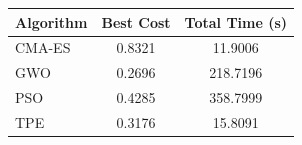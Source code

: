 \begin{table}[h]
\centering
\begin{tabular}{lcc}
\toprule
Algorithm & Best Cost & Total Time (s) \\
\midrule
CMA-ES & 0.8321 & 11.9006 \\
GWO & 0.2696 & 218.7196 \\
PSO & 0.4285 & 358.7999 \\
TPE & 0.3176 & 15.8091 \\
\bottomrule
\end{tabular}
\end{table}